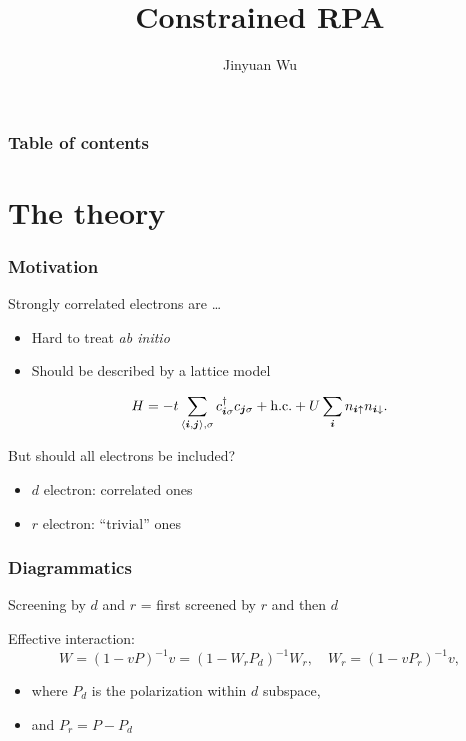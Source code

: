 \documentclass{beamer}
\title{Constrained RPA}
\author{Jinyuan Wu}
\newcommand{\pair}[1]{\langle #1 \rangle}
\newcommand*{\abinitio}{\textit{ab initio}}
\begin{document}
\frame{\titlepage}

\begin{frame}
\frametitle{Table of contents}

\tableofcontents    

\end{frame}

\section{The theory}

\begin{frame}
\frametitle{Motivation}

Strongly correlated electrons are \dots
\begin{itemize}
    \item Hard to treat \abinitio
    \item Should be described by a lattice model
\end{itemize}    

\begin{equation}
    H = - t \sum_{\pair{\vb*{i}, \vb*{j}}, \sigma}
        c^\dagger_{\vb*{i} \sigma} c_{\vb*{j} \sigma}
        + \text{h.c.}
        + U \sum_{\vb*{i}} n_{\vb*{i} \uparrow} n_{\vb*{i} \downarrow}.
\end{equation}

But should all electrons be included?

\begin{itemize}
    \item $d$ electron: correlated ones 
    \item $r$ electron: ``trivial'' ones
\end{itemize}

\end{frame}

\begin{frame}
\frametitle{Diagrammatics}

Screening by $d$ and $r$ = first screened by $r$ and then $d$

Effective interaction:
\begin{equation}
    W = (1 - v P)^{-1} v = (1 - W_r P_d)^{-1} W_r, \quad 
    W_r = (1 - v P_r)^{-1} v,
\end{equation}
\begin{itemize}
    \item where $P_d$ is the polarization within $d$ subspace,
    \item and $P_r = P - P_d$
\end{itemize}

\begin{center}
    
\end{center}

\end{frame}
\end{document}

